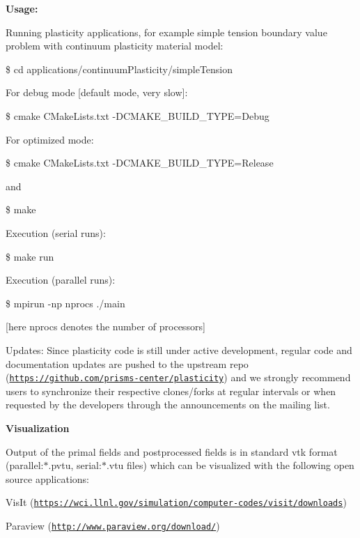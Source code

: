 {\bfseries Usage\-:}

Running plasticity applications, for example simple tension boundary value problem with continuum plasticity material model\-:\par

\begin{DoxyItemize}
\item \$ cd applications/continuum\-Plasticity/simple\-Tension \par
 For debug mode \mbox{[}default mode, very slow\mbox{]}\-: \par

\item \$ cmake C\-Make\-Lists.\-txt -\/\-D\-C\-M\-A\-K\-E\-\_\-\-B\-U\-I\-L\-D\-\_\-\-T\-Y\-P\-E=Debug \par
 For optimized mode\-:\par

\item \$ cmake C\-Make\-Lists.\-txt -\/\-D\-C\-M\-A\-K\-E\-\_\-\-B\-U\-I\-L\-D\-\_\-\-T\-Y\-P\-E=Release \par
 and \par

\item \$ make \par
\par
 Execution (serial runs)\-: \par

\item \$ make run \par
 Execution (parallel runs)\-: \par

\item \$ mpirun -\/np nprocs ./main \par
 \mbox{[}here nprocs denotes the number of processors\mbox{]}
\end{DoxyItemize}

Updates\-: Since plasticity code is still under active development, regular code and documentation updates are pushed to the upstream repo (\href{https://github.com/prisms-center/plasticity}{\tt https\-://github.\-com/prisms-\/center/plasticity}) and we strongly recommend users to synchronize their respective clones/forks at regular intervals or when requested by the developers through the announcements on the mailing list.

{\bfseries Visualization}

Output of the primal fields and postprocessed fields is in standard vtk format (parallel\-:$\ast$.pvtu, serial\-:$\ast$.vtu files) which can be visualized with the following open source applications\-:
\begin{DoxyEnumerate}
\item Vis\-It (\href{https://wci.llnl.gov/simulation/computer-codes/visit/downloads}{\tt https\-://wci.\-llnl.\-gov/simulation/computer-\/codes/visit/downloads})
\item Paraview (\href{http://www.paraview.org/download/}{\tt http\-://www.\-paraview.\-org/download/})
\end{DoxyEnumerate}

